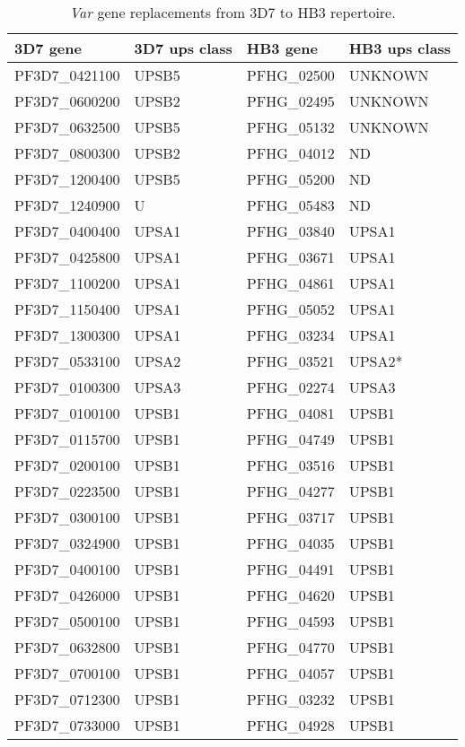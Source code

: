 \begin{table}[]
\centering
\caption{\textit{Var} gene replacements from 3D7 to HB3 repertoire.}
\label{tb:hb3_vars}
\begin{tabular}{@{}llll@{}}
\toprule
3D7 gene & 3D7 ups class & HB3 gene & HB3 ups class \\
\midrule
PF3D7\_0421100 & UPSB5 & PFHG\_02500 & UNKNOWN \\
PF3D7\_0600200 & UPSB2 & PFHG\_02495 & UNKNOWN \\
PF3D7\_0632500 & UPSB5 & PFHG\_05132 & UNKNOWN \\
PF3D7\_0800300 & UPSB2 & PFHG\_04012 & ND \\
PF3D7\_1200400 & UPSB5 & PFHG\_05200 & ND \\
PF3D7\_1240900 & U     & PFHG\_05483 & ND \\
PF3D7\_0400400 & UPSA1 & PFHG\_03840 & UPSA1 \\
PF3D7\_0425800 & UPSA1 & PFHG\_03671 & UPSA1 \\
PF3D7\_1100200 & UPSA1 & PFHG\_04861 & UPSA1 \\
PF3D7\_1150400 & UPSA1 & PFHG\_05052 & UPSA1 \\
PF3D7\_1300300 & UPSA1 & PFHG\_03234 & UPSA1 \\
PF3D7\_0533100 & UPSA2 & PFHG\_03521 & UPSA2* \\
PF3D7\_0100300 & UPSA3 & PFHG\_02274 & UPSA3 \\
PF3D7\_0100100 & UPSB1 & PFHG\_04081 & UPSB1 \\
PF3D7\_0115700 & UPSB1 & PFHG\_04749 & UPSB1 \\
PF3D7\_0200100 & UPSB1 & PFHG\_03516 & UPSB1 \\
PF3D7\_0223500 & UPSB1 & PFHG\_04277 & UPSB1 \\
PF3D7\_0300100 & UPSB1 & PFHG\_03717 & UPSB1 \\
PF3D7\_0324900 & UPSB1 & PFHG\_04035 & UPSB1 \\
PF3D7\_0400100 & UPSB1 & PFHG\_04491 & UPSB1 \\
PF3D7\_0426000 & UPSB1 & PFHG\_04620 & UPSB1 \\
PF3D7\_0500100 & UPSB1 & PFHG\_04593 & UPSB1 \\
PF3D7\_0632800 & UPSB1 & PFHG\_04770 & UPSB1 \\
PF3D7\_0700100 & UPSB1 & PFHG\_04057 & UPSB1 \\
PF3D7\_0712300 & UPSB1 & PFHG\_03232 & UPSB1 \\
PF3D7\_0733000 & UPSB1 & PFHG\_04928 & UPSB1 \\

\end{tabular}
\end{table}
